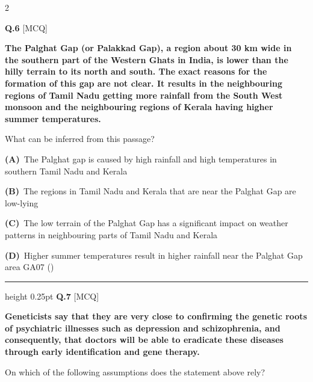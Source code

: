 \documentclass[a4paper,10pt,twoside]{article}
\begin{document}
\begin{multicols}{2}
\vspace{6pt}
\vspace{3pt}

\noindent\textbf{Q.6} \hfill {\footnotesize\textsf{[MCQ]}}
\par\vspace{2pt}
{\bfseries The Palghat Gap (or Palakkad Gap), a region about 30 km wide in the southern part of the Western
Ghats in India, is lower than the hilly terrain to its north and south. The exact reasons for the
formation of this gap are not clear. It results in the neighbouring regions of Tamil Nadu getting
more rainfall from the South West monsoon and the neighbouring regions of Kerala having higher
summer temperatures.
\par\smallskip
What can be inferred from this passage? \par}
\par\vspace{2pt}\noindent
\textbf{(A)}~The Palghat gap is caused by high rainfall and high temperatures in southern Tamil Nadu and \newline Kerala\par\vspace{2pt}\noindent
\textbf{(B)}~The regions in Tamil Nadu and Kerala that are near the Palghat Gap are low-lying\par\vspace{2pt}\noindent
\textbf{(C)}~The low terrain of the Palghat Gap has a significant impact on weather patterns in neighbouring \newline parts of Tamil Nadu and Kerala\par\vspace{2pt}\noindent
\textbf{(D)}~Higher summer temperatures result in higher rainfall near the Palghat Gap area \newline GA07 ()
\par\vspace{6pt}\hrule height 0.25pt\vspace{6pt}
\noindent\textbf{Q.7} \hfill {\footnotesize\textsf{[MCQ]}}
\par\vspace{2pt}
{\bfseries Geneticists say that they are very close to confirming the genetic roots of psychiatric illnesses such
as depression and schizophrenia, and consequently, that doctors will be able to eradicate these
diseases through early identification and gene therapy.
\par\smallskip
On which of the following assumptions does the statement above rely? \par}

\end{multicols}
\end{document}
